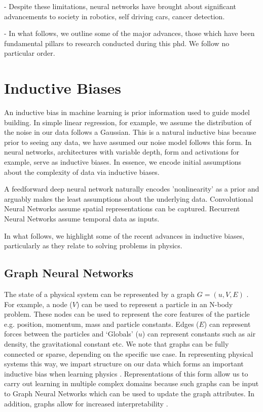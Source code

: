 \documentclass{article}
\begin{document}
- Despite these limitations, neural networks have brought about significant advancements to society in robotics, self driving cars, cancer detection.

- In what follows, we outline some of the major advances, those which have been fundamental pillars to research conducted during this phd. We follow no particular order.

\section{Inductive Biases}

An inductive bias in machine learning is prior information used to guide model building. In simple linear regression, for example, we assume the distribution of the noise in our data follows a Gaussian. This is a natural inductive bias because prior to seeing any data, we have assumed our noise model follows this form. In neural networks, architectures with variable depth, form and activations for example, serve as inductive biases. In essence, we encode initial assumptions about the complexity of data via inductive biases. 

A feedforward deep neural network naturally encodes 'nonlinearity' as a prior and arguably makes the least assumptions about the underlying data. Convolutional Neural Networks assume spatial representations can be captured. Recurrent Neural Networks assume temporal data as inputs. 

In what follows, we highlight some of the recent advances in inductive biases, particularly as they relate to solving problems in physics.

\subsection{Graph Neural Networks}

The state of a physical system can be represented by a graph $G = (u,V,E)$ \cite{battaglia_relational_2018}. For example, a node ($V$) can be used to represent a particle in an N-body problem. These nodes can be used to represent the core features of the particle e.g. position, momentum, mass and particle constants. Edges ($E$) can represent forces between the particles and `Globals' ($u$) can represent constants such as air density, the gravitational constant etc. We note that graphs can be fully connected or sparse, depending on the specific use case. In representing physical systems this way, we impart structure on our data which forms an important inductive bias when learning physics \cite{battaglia_interaction_2016, battaglia_relational_2018, sanchez-gonzalez_graph_2018,seo_differentiable_2019,cranmer_learning_2019, seo_physics-aware_2020, sanchez-gonzalez_learning_2020,lamb_graph_2020,cranmer_lagrangian_2020}. Representations of this form allow us to carry out learning in multiple complex domains because such graphs can be input to Graph Neural Networks which can be used to update the graph attributes. In addition, graphs allow for increased interpretability \cite{battaglia_relational_2018}.
\end{document}
